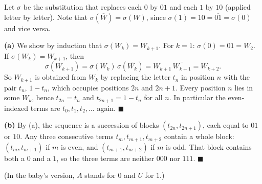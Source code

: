 Let $\sigma$ be the substitution that replaces each $0$ by $01$ and each $1$ by $10$ (applied letter by letter). Note that $\sigma\left(\overline{W}\right)=\overline{\sigma(W)}$, since $\sigma(1)=10=\overline{01}=\overline{\sigma(0)}$ and vice versa.

\textbf{(a)} We show by induction that $\sigma(W_k)=W_{k+1}$. For $k=1$: $\sigma(0)=01=W_2$. If $\sigma(W_k)=W_{k+1}$, then
\[\sigma(W_{k+1})=\sigma(W_k)\,\sigma\left(\overline{W_k}\right)=W_{k+1}\,\overline{W_{k+1}}=W_{k+2}.\]
So $W_{k+1}$ is obtained from $W_k$ by replacing the letter $t_n$ in position $n$ with the pair $t_n,\,1-t_n$, which occupies positions $2n$ and $2n+1$. Every position $n$ lies in some $W_k$, hence $t_{2n}=t_n$ and $t_{2n+1}=1-t_n$ for all $n$. In particular the even-indexed terms are $t_0,t_1,t_2,\dots$ again. $\blacksquare$

\textbf{(b)} By (a), the sequence is a succession of blocks $(t_{2n},t_{2n+1})$, each equal to $01$ or $10$. Any three consecutive terms $t_m,t_{m+1},t_{m+2}$ contain a whole block: $(t_m,t_{m+1})$ if $m$ is even, and $(t_{m+1},t_{m+2})$ if $m$ is odd. That block contains both a $0$ and a $1$, so the three terms are neither $000$ nor $111$. $\blacksquare$

(In the baby's version, $A$ stands for $0$ and $U$ for $1$.)
